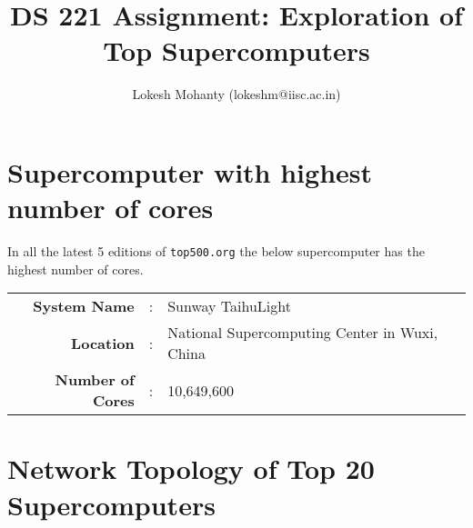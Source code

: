 \documentclass{article}
\title{DS 221 Assignment: Exploration of Top Supercomputers}
\author{Lokesh Mohanty (lokeshm@iisc.ac.in)}
\begin{document}
\maketitle

\section{Supercomputer with highest number of cores}

In all the latest 5 editions of \verb~top500.org~ the below supercomputer has the highest number of cores.\\

\label{sec:number-cores}
\begin{tabular}[tb]{rcl}
  \textbf{System Name} &: &Sunway TaihuLight \\
  \textbf{Location} &: &National Supercomputing Center in Wuxi, China\\
  \textbf{Number of Cores} &: &10,649,600\\
\end{tabular}

\section{Network Topology of Top 20 Supercomputers}
\label{sec:topology}
\end{document}
